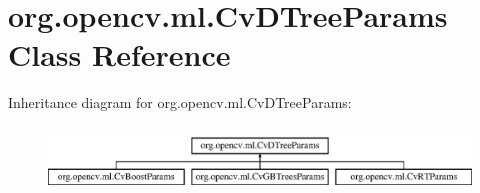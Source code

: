 \hypertarget{classorg_1_1opencv_1_1ml_1_1_cv_d_tree_params}{}\section{org.\+opencv.\+ml.\+Cv\+D\+Tree\+Params Class Reference}
\label{classorg_1_1opencv_1_1ml_1_1_cv_d_tree_params}
Inheritance diagram for org.\+opencv.\+ml.\+Cv\+D\+Tree\+Params\+:\begin{figure}[H]
\begin{center}
\leavevmode
\includegraphics[height=1.761006cm]{classorg_1_1opencv_1_1ml_1_1_cv_d_tree_params}
\end{center}
\end{figure}
